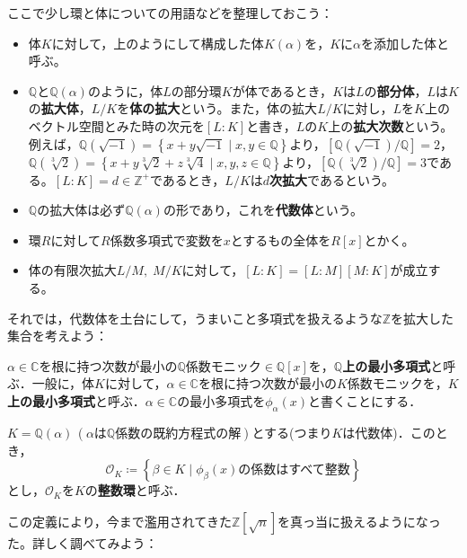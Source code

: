 ここで少し環と体についての用語などを整理しておこう：
\begin{itemize}
\item 体$K$に対して，上のようにして構成した体$K(\alpha)$を，$K$に$\alpha$を添加した体と呼ぶ。
\item $\mathds{Q}$と$\mathds{Q}(\alpha)$のように，体$L$の部分環$K$が体であるとき，$K$は$L$の\textbf{部分体}，$L$は$K$の\textbf{拡大体}，$L/K$を\textbf{体の拡大}という。また，体の拡大$L/K$に対し，$L$を$K$上のベクトル空間とみた時の次元を$[L:K]$と書き，$L$の$K$上の\textbf{拡大次数}という。例えば，$\mathds{Q}(\sqrt{-1})=\left\{x+y\sqrt{-1}\mid x,y\in\mathds{Q}\right\}$より，$[\mathds{Q}(\sqrt{-1})/{\mathds{Q}}]=2$，$\mathds{Q}(\sqrt[3]{2})=\left\{x+y\sqrt[3]{2}+z\sqrt[3]{4}\mid x,y,z\in\mathds{Q}\right\}$より，$[\mathds{Q}(\sqrt[3]{2})/{\mathds{Q}}]=3$である。$[L:K]=d\in\mathds{Z}^{+}$であるとき，$L/K$は\textbf{$d$次拡大}であるという。
\item $\mathds{Q}$の拡大体は必ず$\mathds{Q}(\alpha)$の形であり，これを\textbf{代数体}という。
\item 環$R$に対して$R$係数多項式で変数を$x$とするもの全体を$R[x]$とかく。
\item 体の有限次拡大$L/M,\; M/K$に対して，$[L:K]=[L:M][M:K]$が成立する。
\end{itemize}

それでは，代数体を土台にして，うまいこと多項式を扱えるような$\mathds{Z}$を拡大した集合を考えよう：

\begin{dfn}[最小多項式]
    $\alpha\in\mathds{C}$を根に持つ次数が最小の$\mathds{Q}$係数モニック$\in\mathds{Q}[x]$を，\textbf{$\mathds{Q}$上の最小多項式}と呼ぶ．一般に，体$K$に対して，$\alpha\in\mathds{C}$を根に持つ次数が最小の$K$係数モニックを，\textbf{$K$上の最小多項式}と呼ぶ．$\alpha\in\mathds{C}$の最小多項式を$\phi_{\alpha}(x)$と書くことにする．
\end{dfn}

\begin{dfn}
    $K=\mathds{Q}(\alpha)\, (\alpha\text{は}\mathds{Q}\text{係数の既約方程式の解})$とする(つまり$K$は代数体)．このとき，\[
    \mathcal{O}_K\coloneqq \left\{\beta\in K\mid \phi_{\beta}(x)\text{の係数はすべて整数}\right\}
    \]とし，$\mathcal{O}_K$を$K$の\textbf{整数環}と呼ぶ．
\end{dfn}

この定義により，今まで濫用されてきた$\mathds{Z}[\sqrt{n}]$を真っ当に扱えるようになった。詳しく調べてみよう：

